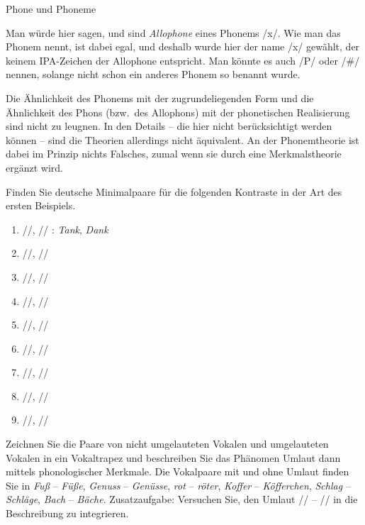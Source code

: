 \begin{Vertiefung}{Phone und Phoneme}
\begin{exe}
  \ex\label{ex:prosodischewoerter177}
  \begin{xlist}
  \end{xlist}
\end{exe}

Man würde hier sagen, \textipa{[\c{c}]} und \textipa{[X]} sind \textit{Allophone} eines Phonems /x/.
Wie man das Phonem nennt, ist dabei egal, und deshalb wurde hier der name /x/ gewählt, der keinem IPA-Zeichen der Allophone entspricht.
Man könnte es auch /P/ oder /\#/ nennen, solange nicht schon ein anderes Phonem so benannt wurde.

Die Ähnlichkeit des Phonems mit der zugrundeliegenden Form und die Ähnlichkeit des Phons (bzw.\ des Allophons) mit der phonetischen Realisierung sind nicht zu leugnen.
In den Details -- die hier nicht berücksichtigt werden können -- sind die Theorien allerdings nicht äquivalent.
An der Phonemtheorie ist dabei im Prinzip nichts Falsches, zumal wenn sie durch eine Merkmalstheorie ergänzt wird.

\end{Vertiefung}

\Uebungen

 \label{exc:phonologie01} Finden Sie deutsche Minimalpaare für die folgenden Kontraste in der Art des ersten Beispiels.

\begin{enumerate}
  \item{//, // : \textit{Tank}, \textit{Dank}}
  \item{//, //}
  \item{//, //}
  \item{//, //}
  \item{//, //}
  \item{//, //}
  \item{//, //}
  \item{//, //}
  \item{//, //}
\end{enumerate}

 \label{exc:phonologie02} Zeichnen Sie die Paare von nicht umgelauteten Vokalen und umgelauteten Vokalen in ein Vokaltrapez und beschreiben Sie das Phänomen Umlaut dann mittels phonologischer Merkmale.
Die Vokalpaare mit und ohne Umlaut finden Sie in \textit{Fuß} -- \textit{Füße}, \textit{Genuss} -- \textit{Genüsse}, \textit{rot} -- \textit{röter}, \textit{Koffer} -- \textit{Köfferchen}, \textit{Schlag} -- \textit{Schläge}, \textit{Bach} -- \textit{Bäche}.
Zusatzaufgabe: Versuchen Sie, den Umlaut // -- // in die Beschreibung zu integrieren.

